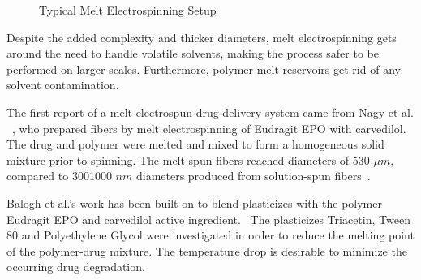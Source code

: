 \documentclass[5p,,preprint,12pt,twocolumn]{elsarticle}
\makeatletter
\def\fixFloatSize#1{}%
\makeatother
\begin{document}
\bgroup
\fixFloatSize{images/9d06b4aa-134c-4fd6-bbf3-1ced4ac95046-uimg_metl_setup.png}
\begin{figure}[!htbp]
\centering \makeatletter{}
\makeatother 
\caption{{Typical Melt Electrospinning Setup}}
\label{f-bfd139aecf8f}
\end{figure}
\egroup
Despite the added complexity and thicker diameters, melt electrospinning  gets around the need to handle volatile solvents, making the process safer to be performed on larger scales. Furthermore, polymer melt reservoirs get rid of any solvent contamination.

The first report of a melt electrospun drug delivery system came from Nagy et al. \unskip~\cite{527120:13445555}, who prepared fibers by melt electrospinning of Eudragit EPO with carvedilol. The drug and polymer were melted and mixed to form a homogeneous solid mixture prior to spinning. The melt-spun fibers reached diameters of 5{\textendash}30 $\mu m $, compared to 300{\textendash}1000 $nm $ diameters produced from solution-spun fibers\unskip~\cite{527120:13445555}.

Balogh et al.'s work has been built on to blend plasticizes with the polymer Eudragit EPO and carvedilol active ingredient.\unskip~\cite{527120:13445752} The plasticizes Triacetin, Tween 80 and Polyethylene Glycol were investigated in order to reduce the melting point of the polymer-drug mixture. The temperature drop is desirable to minimize the occurring drug degradation.
\end{document}
